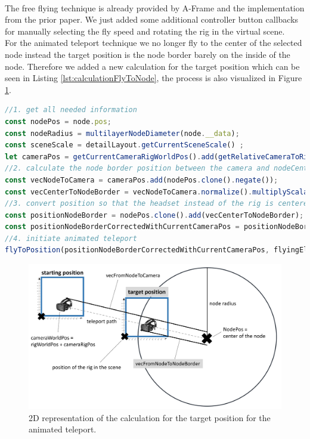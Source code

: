 \\
The free flying technique is already provided by A-Frame and the implementation from the prior paper.
We just added some additional controller button callbacks for manually selecting the fly speed and rotating the rig in the virtual scene.\\
For the animated teleport technique we no longer fly to the center of the selected node instead the target position is the node border barely on the inside of the node. Therefore we added a new calculation for the target position which can be seen in Listing \ref{lst:calculationFlyToNode}, the process is also visualized in Figure \ref{fig:vrFlyToNode}.

\begin{lstlisting}[language=JavaScript,label={lst:calculationFlyToNode},caption=Matrix calculations for determining the target position of the animated teleport.]
//1. get all needed information
const nodePos = node.pos;
const nodeRadius = multilayerNodeDiameter(node.__data);
const sceneScale = detailLayout.getCurrentSceneScale() ;
let cameraPos = getCurrentCameraRigWorldPos().add(getRelativeCameraToRigPos());
//2. calculate the node border position between the camera and nodeCenter
const vecNodeToCamera = cameraPos.add(nodePos.clone().negate());
const vecCenterToNodeBorder = vecNodeToCamera.normalize().multiplyScalar(nodeRadius*0.95*sceneScale);//*0.95 as we want to be slightly inside the selected node
//3. convert position so that the headset instead of the rig is centered
const positionNodeBorder = nodePos.clone().add(vecCenterToNodeBorder);
const positionNodeBorderCorrectedWithCurrentCameraPos = positionNodeBorder.clone().add(getRelativeCameraToRigPos().negate());
//4. initiate animated teleport
flyToPosition(positionNodeBorderCorrectedWithCurrentCameraPos, flyingElement);
\end{lstlisting}
\begin{figure}[h]
    \centering
    \includegraphics[width=1\textwidth]{graphics/flyToNodePositionCalc.jpg}
    \caption{2D representation of the calculation for the target position for the animated teleport.} 
    \label{fig:vrFlyToNode} 
\end{figure}

